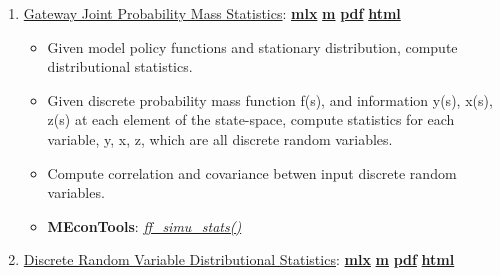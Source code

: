 \documentclass[
]{book}
\providecommand{\tightlist}{%
  \setlength{\itemsep}{0pt}\setlength{\parskip}{0pt}}
\begin{document}
\begin{enumerate}
\def\labelenumi{\arabic{enumi}.}
\tightlist
\item
  \href{https://fanwangecon.github.io/MEconTools/MEconTools/doc/stats/htmlpdfm/fx_simu_stats.html}{Gateway Joint Probability Mass Statistics}: \href{https://github.com/FanWangEcon/MEconTools/blob/master/MEconTools/doc/stats/fx_simu_stats.mlx}{\textbf{mlx}} \textbar{} \href{https://github.com/FanWangEcon/MEconTools/blob/master/MEconTools/doc/stats/htmlpdfm/fx_simu_stats.m}{\textbf{m}} \textbar{} \href{https://github.com/FanWangEcon/MEconTools/blob/master/MEconTools/doc/stats/htmlpdfm/fx_simu_stats.pdf}{\textbf{pdf}} \textbar{} \href{https://fanwangecon.github.io/MEconTools/MEconTools/doc/stats/htmlpdfm/fx_simu_stats.html}{\textbf{html}}

  \begin{itemize}
  \tightlist
  \item
    Given model policy functions and stationary distribution, compute distributional statistics.
  \item
    Given discrete probability mass function f(s), and information y(s), x(s), z(s) at each element of the state-space, compute statistics for each variable, y, x, z, which are all discrete random variables.
  \item
    Compute correlation and covariance betwen input discrete random variables.
  \item
    \textbf{MEconTools}: \emph{\href{https://github.com/FanWangEcon/MEconTools/blob/master/MEconTools/stats/ff_simu_stats.m}{ff\_simu\_stats()}}
  \end{itemize}
\item
  \href{https://fanwangecon.github.io/MEconTools/MEconTools/doc/stats/htmlpdfm/fx_disc_rand_var_stats.html}{Discrete Random Variable Distributional Statistics}: \href{https://github.com/FanWangEcon/MEconTools/blob/master/MEconTools/doc/stats/fx_disc_rand_var_stats.mlx}{\textbf{mlx}} \textbar{} \href{https://github.com/FanWangEcon/MEconTools/blob/master/MEconTools/doc/stats/htmlpdfm/fx_disc_rand_var_stats.m}{\textbf{m}} \textbar{} \href{https://github.com/FanWangEcon/MEconTools/blob/master/MEconTools/doc/stats/htmlpdfm/fx_disc_rand_var_stats.pdf}{\textbf{pdf}} \textbar{} \href{https://fanwangecon.github.io/MEconTools/MEconTools/doc/stats/htmlpdfm/fx_disc_rand_var_stats.html}{\textbf{html}}


\end{enumerate}
\end{document}

